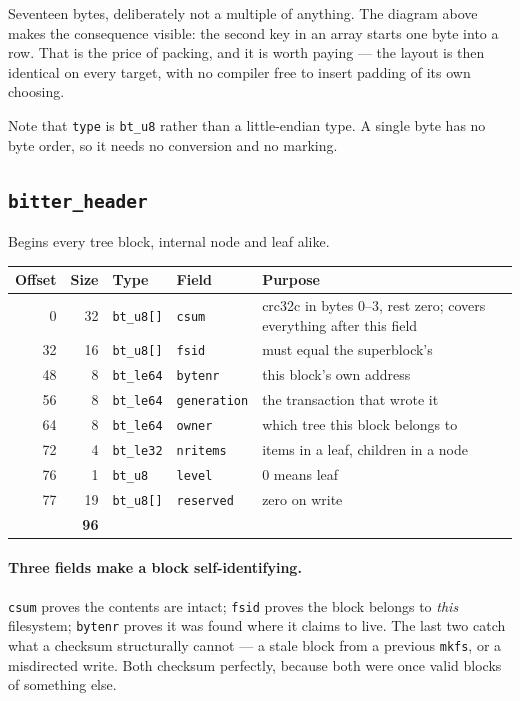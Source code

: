 Seventeen bytes, deliberately not a multiple of anything. The diagram above
makes the consequence visible: the second key in an array starts one byte into
a row. That is the price of packing, and it is worth paying --- the layout is
then identical on every target, with no compiler free to insert padding of its
own choosing.

Note that \texttt{type} is \texttt{bt\_u8} rather than a little-endian type. A
single byte has no byte order, so it needs no conversion and no marking.

\subsection{\texttt{bitter\_header}}

Begins every tree block, internal node and leaf alike.

\begin{center}
\begin{tabular}{rrllp{6.2cm}}
  \toprule
  Offset & Size & Type & Field & Purpose \\
  \midrule
  0  & 32 & \texttt{bt\_u8[]}  & \texttt{csum}       & crc32c in bytes 0--3, rest zero; covers everything after this field \\
  32 & 16 & \texttt{bt\_u8[]}  & \texttt{fsid}       & must equal the superblock's \\
  48 & 8  & \texttt{bt\_le64}  & \texttt{bytenr}     & this block's own address \\
  56 & 8  & \texttt{bt\_le64}  & \texttt{generation} & the transaction that wrote it \\
  64 & 8  & \texttt{bt\_le64}  & \texttt{owner}      & which tree this block belongs to \\
  72 & 4  & \texttt{bt\_le32}  & \texttt{nritems}    & items in a leaf, children in a node \\
  76 & 1  & \texttt{bt\_u8}    & \texttt{level}      & 0 means leaf \\
  77 & 19 & \texttt{bt\_u8[]}  & \texttt{reserved}   & zero on write \\
  \midrule
  \multicolumn{2}{r}{\textbf{96}} & & & \\
  \bottomrule
\end{tabular}
\end{center}

\paragraph{Three fields make a block self-identifying.} \texttt{csum} proves the
contents are intact; \texttt{fsid} proves the block belongs to \emph{this}
filesystem; \texttt{bytenr} proves it was found where it claims to live. The
last two catch what a checksum structurally cannot --- a stale block from a
previous \texttt{mkfs}, or a misdirected write. Both checksum perfectly,
because both were once valid blocks of something else.


